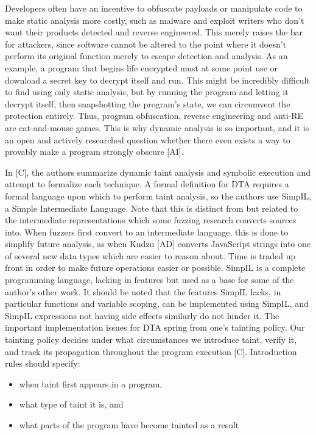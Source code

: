 \documentclass[11pt,expanded,copyright]{fsuthesis}
\begin{document}
Developers often have an incentive to obfuscate payloads or manipulate code to make static analysis more costly, such as malware and exploit writers who don't want their products detected and reverse engineered. This merely raises the bar for attackers, since software cannot be altered to the point where it doesn't perform its original function merely to escape detection and analysis. As an example, a program that begins life encrypted must at some point use or download a secret key to decrypt itself and run. This might be incredibly difficult to find using only static analysis, but by running the program and letting it decrypt itself, then snapshotting the program's state, we can circumvent the protection entirely. Thus, program obfuscation, reverse engineering and anti-RE are cat-and-mouse games.  This is why dynamic analysis is so important, and it is an open and actively researched question whether there even exists a way to provably make a program strongly obscure [AI].

In [C], the authors summarize dynamic taint analysis and symbolic execution and attempt to formalize each technique. A formal definition for DTA requires a formal language upon which to perform taint analysis, so the authors use SimpIL, a Simple Intermediate Language. Note that this is distinct from but related to the intermediate representations which some fuzzing research converts sources into. When fuzzers first convert to an intermediate language, this is done to simplify future analysis, as when Kudzu [AD] converts JavaScript strings into one of several new data types which are easier to reason about. Time is traded up front in order to make future operations easier or possible. SimpIL is a complete programming language, lacking in features but used as a base for some of the author's other work. It should be noted that the features SimpIL lacks, in particular functions and variable scoping, can be implemented using SimpIL, and SimpIL expressions not having side effects similarly do not hinder it. The important implementation issues for DTA spring from one's tainting policy. Our tainting policy decides under what circumstances we introduce taint, verify it, and track its propagation throughout the program execution [C]. Introduction rules should specify:
\begin{itemize}
	\item when taint first appears in a program,
	\item what type of taint it is, and 
	\item what parts of the program have become tainted as a result
\end{itemize}
\end{document}
